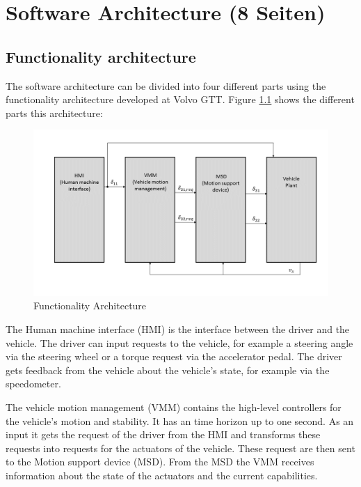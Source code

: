 \documentclass[ExampleMasters.tex]{subfiles}
\begin{document}
\clearpage


\chapter{Software Architecture (8 Seiten)}
\label{chap:software_setup}

\section{Functionality architecture}
\label{sec:func_architecture}

The software architecture can be divided into four different parts using the functionality architecture developed at Volvo GTT. Figure \ref{fig:funct_architecture} shows the different parts this architecture:

\begin{figure}[h]
\centering
\includegraphics[width=1\linewidth]{figures/functionality_architecture}

\caption{Functionality Architecture}
\label{fig:funct_architecture}
\end{figure}

The Human machine interface (HMI) is the interface between the driver and the vehicle. The driver can input requests to the vehicle, for example a steering angle via the steering wheel or a torque request via the accelerator pedal. The driver gets feedback from the vehicle about the vehicle's state, for example via the speedometer.

The vehicle motion management (VMM) contains the high-level controllers for the vehicle's motion and stability. It has an time horizon up to one second. As an input it gets the request of the driver from the HMI and transforms these requests into requests for the actuators of the vehicle. These request are then sent to the Motion support device (MSD). From the MSD the VMM receives information about the state of the actuators and the current capabilities.
\end{document}
